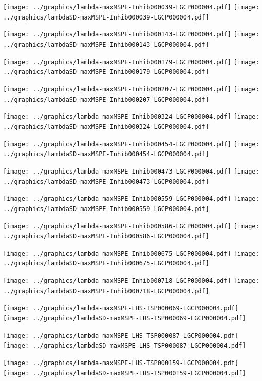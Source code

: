\documentclass[review]{elsarticle}
\begin{document}
\texttt{[image: ../graphics/lambda-maxMSPE-Inhib000039-LGCP000004.pdf]}
\texttt{[image: ../graphics/lambdaSD-maxMSPE-Inhib000039-LGCP000004.pdf]}

\texttt{[image: ../graphics/lambda-maxMSPE-Inhib000143-LGCP000004.pdf]}
\texttt{[image: ../graphics/lambdaSD-maxMSPE-Inhib000143-LGCP000004.pdf]}

\texttt{[image: ../graphics/lambda-maxMSPE-Inhib000179-LGCP000004.pdf]}
\texttt{[image: ../graphics/lambdaSD-maxMSPE-Inhib000179-LGCP000004.pdf]}

\texttt{[image: ../graphics/lambda-maxMSPE-Inhib000207-LGCP000004.pdf]}
\texttt{[image: ../graphics/lambdaSD-maxMSPE-Inhib000207-LGCP000004.pdf]}

\texttt{[image: ../graphics/lambda-maxMSPE-Inhib000324-LGCP000004.pdf]}
\texttt{[image: ../graphics/lambdaSD-maxMSPE-Inhib000324-LGCP000004.pdf]}

\texttt{[image: ../graphics/lambda-maxMSPE-Inhib000454-LGCP000004.pdf]}
\texttt{[image: ../graphics/lambdaSD-maxMSPE-Inhib000454-LGCP000004.pdf]}

\texttt{[image: ../graphics/lambda-maxMSPE-Inhib000473-LGCP000004.pdf]}
\texttt{[image: ../graphics/lambdaSD-maxMSPE-Inhib000473-LGCP000004.pdf]}

\texttt{[image: ../graphics/lambda-maxMSPE-Inhib000559-LGCP000004.pdf]}
\texttt{[image: ../graphics/lambdaSD-maxMSPE-Inhib000559-LGCP000004.pdf]}

\texttt{[image: ../graphics/lambda-maxMSPE-Inhib000586-LGCP000004.pdf]}
\texttt{[image: ../graphics/lambdaSD-maxMSPE-Inhib000586-LGCP000004.pdf]}

\texttt{[image: ../graphics/lambda-maxMSPE-Inhib000675-LGCP000004.pdf]}
\texttt{[image: ../graphics/lambdaSD-maxMSPE-Inhib000675-LGCP000004.pdf]}

\texttt{[image: ../graphics/lambda-maxMSPE-Inhib000718-LGCP000004.pdf]}
\texttt{[image: ../graphics/lambdaSD-maxMSPE-Inhib000718-LGCP000004.pdf]}

\texttt{[image: ../graphics/lambda-maxMSPE-LHS-TSP000069-LGCP000004.pdf]}
\texttt{[image: ../graphics/lambdaSD-maxMSPE-LHS-TSP000069-LGCP000004.pdf]}

\texttt{[image: ../graphics/lambda-maxMSPE-LHS-TSP000087-LGCP000004.pdf]}
\texttt{[image: ../graphics/lambdaSD-maxMSPE-LHS-TSP000087-LGCP000004.pdf]}

\texttt{[image: ../graphics/lambda-maxMSPE-LHS-TSP000159-LGCP000004.pdf]}
\texttt{[image: ../graphics/lambdaSD-maxMSPE-LHS-TSP000159-LGCP000004.pdf]}
\end{document}

